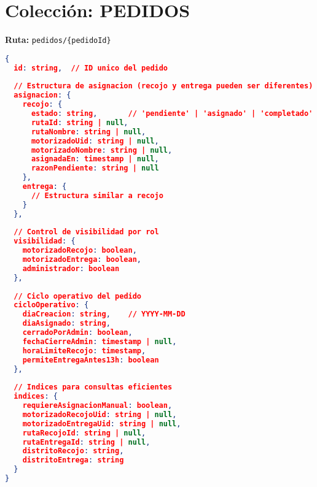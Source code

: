 \section{Colección: PEDIDOS}

\textbf{Ruta:} \texttt{pedidos/\{pedidoId\}}

\begin{lstlisting}[language=json,caption={Estructura de documento Pedido (parte 1)}]
{
  id: string,  // ID unico del pedido
  
  // Estructura de asignacion (recojo y entrega pueden ser diferentes)
  asignacion: {
    recojo: {
      estado: string,       // 'pendiente' | 'asignado' | 'completado'
      rutaId: string | null,
      rutaNombre: string | null,
      motorizadoUid: string | null,
      motorizadoNombre: string | null,
      asignadaEn: timestamp | null,
      razonPendiente: string | null
    },
    entrega: {
      // Estructura similar a recojo
    }
  },
  
  // Control de visibilidad por rol
  visibilidad: {
    motorizadoRecojo: boolean,
    motorizadoEntrega: boolean,
    administrador: boolean
  },
  
  // Ciclo operativo del pedido
  cicloOperativo: {
    diaCreacion: string,    // YYYY-MM-DD
    diaAsignado: string,
    cerradoPorAdmin: boolean,
    fechaCierreAdmin: timestamp | null,
    horaLimiteRecojo: timestamp,
    permiteEntregaAntes13h: boolean
  },
  
  // Indices para consultas eficientes
  indices: {
    requiereAsignacionManual: boolean,
    motorizadoRecojoUid: string | null,
    motorizadoEntregaUid: string | null,
    rutaRecojoId: string | null,
    rutaEntregaId: string | null,
    distritoRecojo: string,
    distritoEntrega: string
  }
}
\end{lstlisting}

